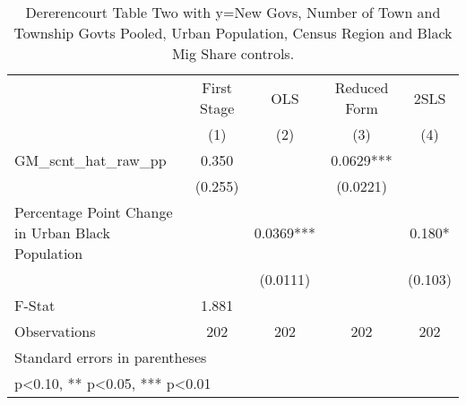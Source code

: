 \begin{table}[htbp]\centering
\def\sym#1{\ifmmode^{#1}\else\(^{#1}\)\fi}
\caption{Dererencourt Table Two with y=New Govs, Number of Town and Township Govts Pooled, Urban Population, Census Region and Black Mig Share controls.}
\begin{tabular}{l*{4}{c}}
\toprule
                    & First Stage   &         OLS   &Reduced Form   &        2SLS   \\
                    &\multicolumn{1}{c}{(1)}   &\multicolumn{1}{c}{(2)}   &\multicolumn{1}{c}{(3)}   &\multicolumn{1}{c}{(4)}   \\
\midrule
GM\_scnt\_hat\_raw\_pp  &       0.350   &               &      0.0629***&               \\
                    &     (0.255)   &               &    (0.0221)   &               \\
\addlinespace
Percentage Point Change in Urban Black Population&               &      0.0369***&               &       0.180*  \\
                    &               &    (0.0111)   &               &     (0.103)   \\
\midrule
F-Stat              &       1.881   &               &               &               \\
Observations        &         202   &         202   &         202   &         202   \\
\bottomrule
\multicolumn{5}{l}{\footnotesize Standard errors in parentheses}\\
\multicolumn{5}{l}{\footnotesize * p<0.10, ** p<0.05, *** p<0.01}\\
\end{tabular}
\end{table}
